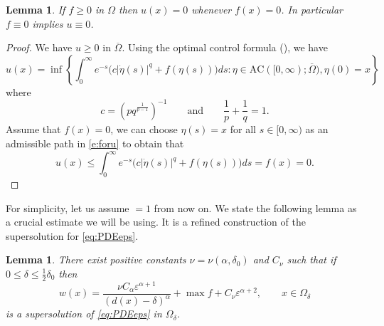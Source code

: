 \documentclass[11pt,reqno]{amsart}
\numberwithin{figure}{section}
\theoremstyle{plain}
\newtheorem{lem}[thm]{Lemma}
\theoremstyle{remark}
\numberwithin{equation}{section}
\begin{document}

\begin{lem}\label{lem:f=0} If $f\geq 0$ in $\Omega$ then $u(x) = 0$ whenever $f(x) = 0$. In particular $f \equiv 0$ implies $u \equiv 0$.
\end{lem}
\begin{proof} We have $u\geq 0$ in $\overline{\Omega}$. Using the optimal control formula (\cite{Bardi1997,Hung2019}), we have
\begin{equation}\label{e:foru}
    u(x) = \inf \left\lbrace \int_0^\infty e^{-  s}\Big(c|\dot{\eta}(s)|^{q} +f(\eta(s))\Big)ds: \eta\in \mathrm{AC}([0,\infty);\overline{\Omega}), \eta(0) = x\right\rbrace
\end{equation}
where 
\begin{equation*}
    c = \left(pq^{\frac{1}{p-1}}\right)^{-1} \qquad\text{and}\qquad \frac{1}{p} + \frac{1}{q} = 1.
\end{equation*}
Assume that $f(x) = 0$, we can choose $\eta(s) = x$ for all $s\in [0,\infty)$ as an admissible path in \eqref{e:foru} to obtain that
\begin{equation*}
    u(x) \leq  \int_0^\infty e^{-  s}\Big(c|\dot{\eta}(s)|^{q} +f(\eta(s))\Big)ds = f(x) =  0.
\end{equation*}
\end{proof}
\noindent For simplicity, let us assume $  = 1$ from now on. We state the following lemma as a crucial estimate we will be using. It is a refined construction of the supersolution for \eqref{eq:PDEeps}.
\begin{lem}\label{lem:super_refined} There exist positive constants $\nu = \nu(\alpha,\delta_0)$ and $C_\nu$ such that if $0\leq \delta \leq \frac{1}{2}\delta_0$ then
\begin{equation*}
    w(x) = \frac{\nu C_\alpha \varepsilon^{\alpha+1}}{(d(x)-\delta)^\alpha} + \max f + C_\nu \varepsilon^{\alpha+2}, \qquad x\in \Omega_\delta 
\end{equation*}
is a supersolution of \eqref{eq:PDEeps} in $\Omega_\delta$. 
\end{lem}
\end{document}

